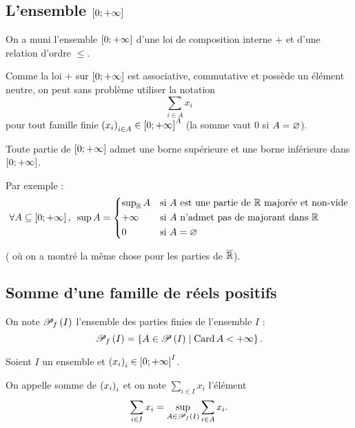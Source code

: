\subsection{L'ensemble \(\left[0;+\infty\right]\)}

\begin{rappel}
On a muni l'ensemble \(\left[0;+\infty\right]\) d'une loi de composition interne \(+\) et d'une relation d'ordre \(\leq\).
\end{rappel}

\begin{nota}
Comme la loi \(+\) sur \(\left[0;+\infty\right]\) est associative, commutative et possède un élément neutre, on peut sans problème utiliser la notation \[\sum_{i\in A}x_i\] pour tout famille finie \(\left(x_i\right)_{i\in A}\in\left[0;+\infty\right]^A\) (la somme vaut \(0\) si \(A=\varnothing\)).
\end{nota}

\begin{prop}
Toute partie de \(\left[0;+\infty\right]\) admet une borne supérieure et une borne inférieure dans \(\left[0;+\infty\right]\).

Par exemple : \[\quantifs{\forall A\subset\intervii{0}{\pinf}}\sup A=\begin{dcases}
{\sup}_\R\,A &\text{si }A\text{ est une partie de }\R\text{ majorée et non-vide} \\
\pinf &\text{si }A\text{ n'admet pas de majorant dans }\R \\
0 &\text{si }A=\ensvide
\end{dcases}\]
\end{prop}

\begin{dem}
 (\cf {} où on a montré la même chose pour les parties de \(\overline{\mathbb{R}}\)).
\end{dem}

\subsection{Somme d'une famille de réels positifs}

\begin{nota}
On note \(\mathscr{P}_f\left(I\right)\) l'ensemble des parties finies de l'ensemble \(I\) : \[\mathscr{P}_f\left(I\right)=\left\lbrace A\in\mathscr{P}\left(I\right)\;\middle|\;\operatorname{Card} A<+\infty\right\rbrace.\]
\end{nota}

\begin{defi}
Soient \(I\) un ensemble et \(\left(x_i\right)_i\in\left[0;+\infty\right]^I\).

On appelle somme de \(\left(x_i\right)_i\) et on note \(\sum_{i\in I}x_i\) l'élément \[\sum_{i\in I}x_i=\sup_{A\in\mathscr{P}_f\left(I\right)}\sum_{i\in A}x_i.\]
\end{defi}

